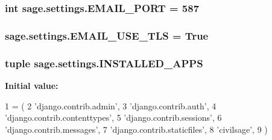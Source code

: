 \subsubsection[{E\+M\+A\+I\+L\+\_\+\+P\+O\+R\+T}]{\setlength{\rightskip}{0pt plus 5cm}int sage.\+settings.\+E\+M\+A\+I\+L\+\_\+\+P\+O\+R\+T = 587}\label{namespacesage_1_1settings_a3fe927460bba6408b5df39fa8a10d367}
\hypertarget{namespacesage_1_1settings_a0fe7c4174cb1b7d03f7b574ae1e5eed9}{}
\subsubsection[{E\+M\+A\+I\+L\+\_\+\+U\+S\+E\+\_\+\+T\+L\+S}]{\setlength{\rightskip}{0pt plus 5cm}sage.\+settings.\+E\+M\+A\+I\+L\+\_\+\+U\+S\+E\+\_\+\+T\+L\+S = True}\label{namespacesage_1_1settings_a0fe7c4174cb1b7d03f7b574ae1e5eed9}
\hypertarget{namespacesage_1_1settings_af48e999a4a4e7f8830d84ac4eb08df1a}{}
\subsubsection[{I\+N\+S\+T\+A\+L\+L\+E\+D\+\_\+\+A\+P\+P\+S}]{\setlength{\rightskip}{0pt plus 5cm}tuple sage.\+settings.\+I\+N\+S\+T\+A\+L\+L\+E\+D\+\_\+\+A\+P\+P\+S}\label{namespacesage_1_1settings_af48e999a4a4e7f8830d84ac4eb08df1a}
{\bfseries Initial value\+:}
\begin{DoxyCode}
1 = (
2     \textcolor{stringliteral}{'django.contrib.admin'},
3     \textcolor{stringliteral}{'django.contrib.auth'},
4     \textcolor{stringliteral}{'django.contrib.contenttypes'},
5     \textcolor{stringliteral}{'django.contrib.sessions'},
6     \textcolor{stringliteral}{'django.contrib.messages'},
7     \textcolor{stringliteral}{'django.contrib.staticfiles'},
8     \textcolor{stringliteral}{'civilsage'},
9 )
\end{DoxyCode}
\hypertarget{namespacesage_1_1settings_ac5b7a49ef37a25508ecb84453063821a}{}
